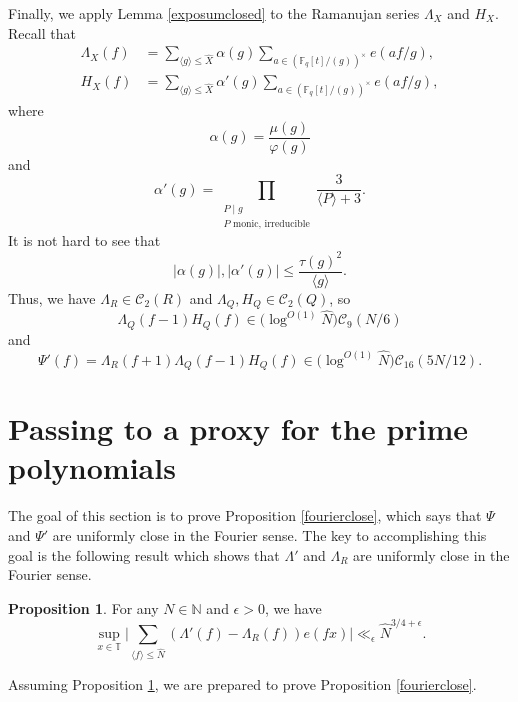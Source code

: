 \documentclass{article}
\theoremstyle{definition}
\newtheorem{prop}{Proposition}[section]
\theoremstyle{definition}
\theoremstyle{remark}
\newcommand{\N}{\mathbb{N}}
\newcommand{\F}{\mathbb{F}_q[t]}
\renewcommand\phi\varphi
\newcommand{\1}{\mathbf{1}}
\numberwithin{equation}{section}
\begin{document}
Finally, we apply Lemma \ref{exposumclosed} to the Ramanujan series $\Lambda_X$ and $H_X$. Recall that 
\begin{align*}
\Lambda_X(f)&=\sum_{\langle g \rangle \leq \widehat{X}}\alpha(g)\sum_{a\in (\F\slash (g))^\times}e(af\slash g),\\
H_X(f)&=\sum_{\langle g \rangle \leq \widehat{X}}\alpha'(g)\sum_{a\in (\F\slash (g))^\times}e(af\slash g),
\end{align*}
where 
\[\alpha(g)=\frac{\mu(g)}{\phi(g)}\]
and 
\[\alpha'(g)=\prod_{\substack{P\mid g\\P\text{~monic, irreducible}}}\frac{3}{\langle P \rangle +3}.\]
It is not hard to see that 
\[|\alpha(g)|,|\alpha'(g)|\leq \frac{\tau(g)^2}{\langle g \rangle}.\]
Thus, we have $\Lambda_R\in \mathcal{C}_2(R)$ and $\Lambda_Q, H_Q\in \mathcal{C}_2(Q)$, so 
\[\Lambda_Q(f-1)H_Q(f)\in \big(\log^{O(1)}\widehat{N}\big)\mathcal{C}_9(N\slash 6)\]
and 
\[\Psi'(f)=\Lambda_R(f+1)\Lambda_Q(f-1)H_Q(f)\in \big(\log^{O(1)}\widehat{N}\big)\mathcal{C}_{16}(5N\slash 12).\]



\section{Passing to a proxy for the prime polynomials}\label{sec:proof of Prop 5.1}
The goal of this section is to prove Proposition \ref{fourierclose}, which says that $\Psi$ and $\Psi'$ are uniformly close in the Fourier sense. The key to accomplishing this goal is the following result which shows that $\Lambda'$ and $\Lambda_R$ are uniformly close in the Fourier sense. 

\begin{prop}\label{Lambdafourierclose} For any $N\in \N$ and $\epsilon>0$, we have
\[\sup_{x\in \mathbb{T}} \Bigg|\sum_{\langle f\rangle \leq \widehat{N}} (\Lambda'(f)-\Lambda_R(f))e(fx)\Bigg|\ll_\epsilon \widehat{N}^{3\slash 4+\epsilon}.\]
\end{prop}

Assuming Proposition \ref{Lambdafourierclose}, we are prepared to prove Proposition \ref{fourierclose}.
\end{document}
